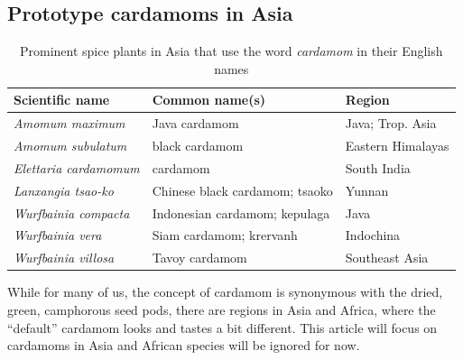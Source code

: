 \documentclass[12pt]{article}
\begin{document}
\subsection{Prototype cardamoms in Asia}

\begin{table}[ht]
    \centering
    \begin{tabularx}{\textwidth}{@{}XXl@{}}
    \toprule
    \textbf{Scientific name} & \textbf{Common name(s)} & \textbf{Region} \\ \midrule
    \textit{Amomum maximum} & Java cardamom & Java; Trop. Asia \\
    \textit{Amomum subulatum} & black cardamom & Eastern Himalayas \\
    \textit{Elettaria cardamomum} & cardamom & South India \\
    \textit{Lanxangia tsao-ko} & Chinese black cardamom; tsaoko & Yunnan \\
    \textit{Wurfbainia compacta} & Indonesian cardamom; kepulaga & Java \\
    \textit{Wurfbainia vera} & Siam cardamom; krervanh & Indochina \\
    \textit{Wurfbainia villosa} & Tavoy cardamom & Southeast Asia \\ \bottomrule
    \end{tabularx}
    \caption{Prominent spice plants in Asia that use the word \textit{cardamom} in their English names}
    \label{tab:cardamoms}
\end{table}

While for many of us, the concept of cardamom is synonymous with the dried, green, camphorous seed pods, there are regions in Asia and Africa, where the ``default'' cardamom looks and tastes a bit different. This article will focus on cardamoms in Asia and African species will be ignored for now. 
\end{document}
